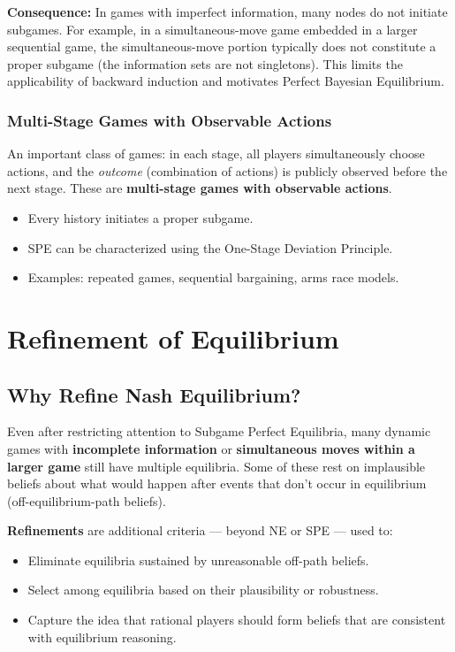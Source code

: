\documentclass[hidelinks]{article}
\begin{document}
\textbf{Consequence:} In games with imperfect information, many nodes do not initiate subgames. For example, in a simultaneous-move game embedded in a larger sequential game, the simultaneous-move portion typically does not constitute a proper subgame (the information sets are not singletons). This limits the applicability of backward induction and motivates Perfect Bayesian Equilibrium.

\subsubsection{Multi-Stage Games with Observable Actions}

An important class of games: in each stage, all players simultaneously choose actions, and the \textit{outcome} (combination of actions) is publicly observed before the next stage. These are \textbf{multi-stage games with observable actions}.

\begin{itemize}
    \item Every history initiates a proper subgame.
    \item SPE can be characterized using the One-Stage Deviation Principle.
    \item Examples: repeated games, sequential bargaining, arms race models.
\end{itemize}

\newpage
\section{Refinement of Equilibrium}

\subsection{Why Refine Nash Equilibrium?}

Even after restricting attention to Subgame Perfect Equilibria, many dynamic games with \textbf{incomplete information} or \textbf{simultaneous moves within a larger game} still have multiple equilibria. Some of these rest on implausible beliefs about what would happen after events that don't occur in equilibrium (off-equilibrium-path beliefs).

\textbf{Refinements} are additional criteria — beyond NE or SPE — used to:
\begin{itemize}
    \item Eliminate equilibria sustained by unreasonable off-path beliefs.
    \item Select among equilibria based on their plausibility or robustness.
    \item Capture the idea that rational players should form beliefs that are consistent with equilibrium reasoning.
\end{itemize}
\end{document}
